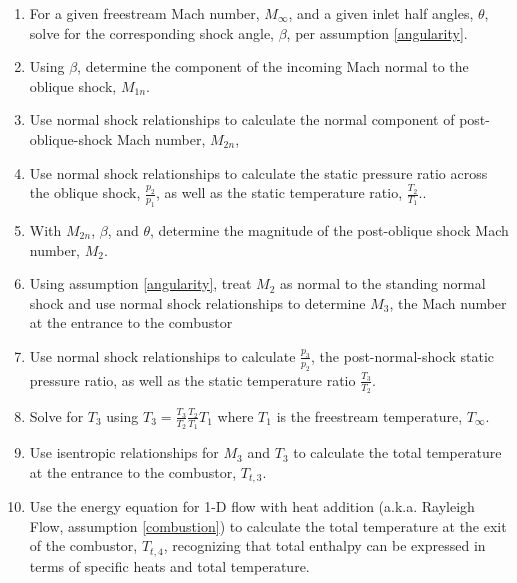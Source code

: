 \documentclass[../main.tex]{subfiles}
\begin{document}
\begin{enumerate}

    \item For a given freestream Mach number, \(M_\infty\), and a given inlet half angles, \(\theta\), solve for the corresponding shock angle, \(\beta\), per assumption \ref{angularity}. 

    \item Using \(\beta\), determine the component of the incoming Mach normal to the oblique shock, \(M_{1n}\).
    
    \item Use normal shock relationships to calculate the normal component of post-oblique-shock Mach number, \(M_{2n}\), 
    
    \item Use normal shock relationships to calculate the static pressure ratio across the oblique shock, \(\frac{p_2}{p_1}\), as well as the static temperature ratio, \(\frac{T_2}{T_1}\)..
    
    \item With \(M_{2n}\), \(\beta\), and \(\theta\), determine the magnitude of the post-oblique shock Mach number, \(M_2\).
    
    \item Using assumption \ref{angularity}, treat \(M_2\) as normal to the standing normal shock and use normal shock relationships to determine \(M_3\), the Mach number at the entrance to the combustor
    
    \item Use normal shock relationships to calculate \(\frac{p_3}{p_2}\), the post-normal-shock static pressure ratio, as well as the static temperature ratio \(\frac{T_3}{T_2}\).

    \item Solve for \(T_3\) using \(T_3 = \frac{T_3}{T_2} \frac{T_2}{T_1} T_1\) where \(T_1\) is the freestream temperature, \(T_\infty\).

    \item Use isentropic relationships for \(M_3\) and \(T_3\) to calculate the total temperature at the entrance to the combustor, \(T_{t,3}\).
    
    \item Use the energy equation for 1-D flow with heat addition (a.k.a. Rayleigh Flow, assumption \ref{combustion}) to calculate the total temperature at the exit of the combustor, \(T_{t,4}\), recognizing that total enthalpy can be expressed in terms of specific heats and total temperature.


\end{enumerate}
\end{document}
